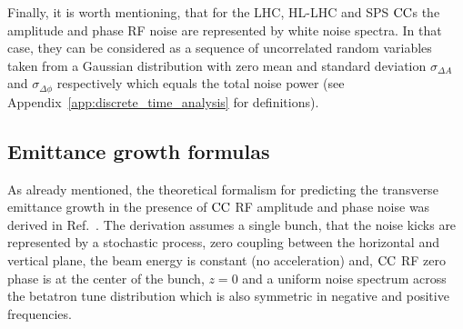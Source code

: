  Finally, it is worth mentioning, that for the LHC, HL-LHC and SPS ${\mathrm{CC}}$s the amplitude and phase RF noise are represented by white noise spectra. In that case, they can be considered as a sequence of uncorrelated random variables taken from a Gaussian distribution with zero mean and standard deviation $\sigma_{\Delta A}$ and  $\sigma_{\Delta \phi}$ respectively which equals the total noise power (see Appendix~\ref{app:discrete_time_analysis} for definitions). %

\subsection{Emittance growth formulas}\label{subsec:CC_emit_growth_theoretical_formulas}
As already mentioned, the theoretical formalism for predicting the transverse emittance growth in the presence of ${\mathrm{CC}}$ RF amplitude and phase noise was derived in Ref.~\cite{PhysRevSTAB.18.101001}. The derivation assumes a single bunch, that the noise kicks are represented by a stochastic process, zero coupling between the horizontal and vertical plane, the beam energy is constant (no acceleration) and, ${\mathrm{CC}}$ RF zero phase is at the center of the bunch, $z=0$ and a uniform noise spectrum across the betatron tune distribution which is also symmetric in negative and positive frequencies. 

